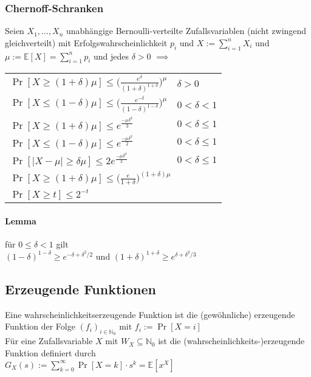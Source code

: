 \documentclass[a4paper,9pt]{extarticle}
\begin{document}
\subsubsection*{Chernoff-Schranken}
Seien $X_1, \dots, X_n$ unabhängige Bernoulli-verteilte Zufallsvariablen (nicht zwingend gleichverteilt) mit Erfolgswahrscheinlichkeit $p_i$ und $X := \sum_{i=1}^n X_i$ und $\mu := \mathbb{E}[X] = \sum_{i=1}^n p_i$ und jedes $\delta > 0$ $\implies$ \\
\renewcommand{\arraystretch}{2}
\begin{tabular}{l@{~~für alle }l}
	$\Pr[X ≥ (1 + \delta) \mu] ≤ \bigg(\frac{e^\delta}{(1 + \delta)^{1 + \delta}}\bigg)^\mu$ & $\delta > 0$ \\
	$\Pr[X ≤ (1 - \delta)\mu] ≤ \bigg(\frac{e^{-\delta}}{(1 - \delta)^{1 - \delta}}\bigg)^\mu$ & $0 < \delta < 1$ \\
	$\Pr[X ≥ (1 + \delta)\mu] ≤ e^{\frac{-\mu\delta^2}{3}}$ & $0 < \delta ≤ 1$ \\	
	$\Pr[X ≤ (1 - \delta)\mu] ≤ e^{\frac{-\mu\delta^2}{2}}$ & $0 < \delta ≤ 1$ \\
	$\Pr[|X - \mu| ≥ \delta\mu] ≤ 2e^{\frac{-\mu\delta^2}{3}}$ & $0 < \delta ≤ 1$ \\
	\multicolumn{2}{l}{$\Pr[X ≥ (1 + \delta)\mu] ≤ \Big(\frac{e}{1 + \delta}\Big)^{(1 + \delta)\mu}$} \\
	\multicolumn{2}{l}{$\Pr[X ≥ t] ≤ 2^{-t}$} für $t ≥ 2e\mu$ \\
\end{tabular}
\renewcommand{\arraystretch}{1}

\paragraph*{Lemma}
für $0 ≤ \delta < 1$ gilt \\
$(1 - \delta)^{1-\delta} ≥ e^{-\delta + \delta^2/2}$ und $(1 + \delta)^{1 + \delta} ≥ e^{\delta + \delta^2/3}$

\subsection*{Erzeugende Funktionen}
Eine wahrscheinlichkeitserzeugende Funktion ist die (gewöhnliche) erzeugende Funktion der Folge $(f_i)_{i \in \mathbb{N}_0}$ mit $f_i := \Pr[X = i]$ \\

Für eine Zufallsvariable $X$ mit $W_X \subseteq \mathbb{N}_0$ ist die (wahrscheinlichkeits-)erzeugende Funktion definiert durch \\
$G_X(s) := \sum_{k=0}^∞ \Pr[X = k] ⋅ s^k = \mathbb{E}[x^X]$ \\
\end{document}
